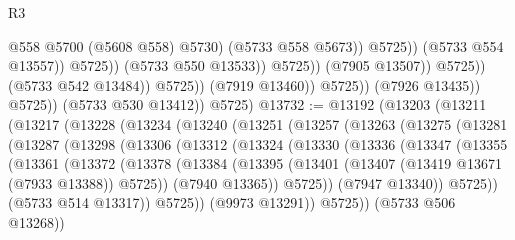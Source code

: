 \begin{lexlean}{R3}
\begin{coremodule}
                                                    @558
                                                    @5700
                                                    (@5608 @558)
                                                    @5730)
                                                  (@5733 @558 @5673))
                                                @5725))
                                            (@5733 @554 @13557))
                                          @5725))
                                      (@5733 @550 @13533))
                                    @5725))
                                (@7905 @13507))
                              @5725))
                          (@5733 @542 @13484))
                        @5725))
                    (@7919 @13460))
                  @5725))
              (@7926 @13435))
            @5725))
        (@5733 @530 @13412))
      @5725)
@13732 := @13192
    (@13203
      (@13211
        (@13217
          (@13228
            (@13234
              (@13240
                (@13251
                  (@13257
                    (@13263
                      (@13275
                        (@13281
                          (@13287
                            (@13298
                              (@13306
                                (@13312
                                  (@13324
                                    (@13330
                                      (@13336
                                        (@13347
                                          (@13355
                                            (@13361
                                              (@13372
                                                (@13378
                                                  (@13384
                                                    (@13395
                                                      (@13401
                                                        (@13407
                                                          (@13419 @13671 (@7933 @13388))
                                                          @5725))
                                                      (@7940 @13365))
                                                    @5725))
                                                (@7947 @13340))
                                              @5725))
                                          (@5733 @514 @13317))
                                        @5725))
                                    (@9973 @13291))
                                  @5725))
                              (@5733 @506 @13268))

\end{coremodule}
\end{lexlean}

